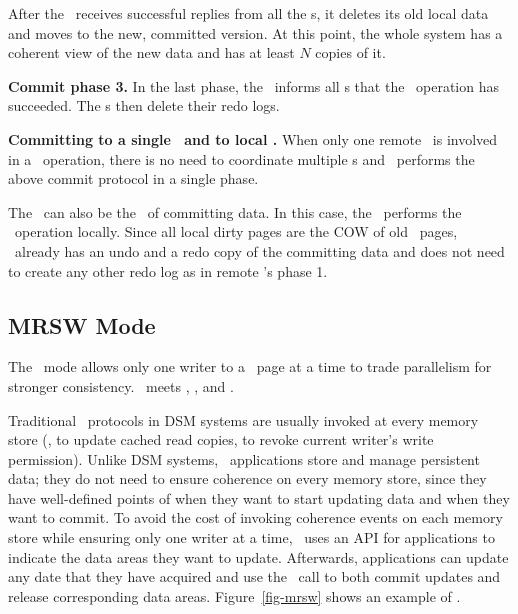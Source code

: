 After the \xn\ receives successful replies from all the \on{}s, 
it deletes its old local data and moves to the new, committed version. 
At this point, the whole system has a coherent view of the new data
and has at least $N$ copies of it.

{\bf Commit phase 3.}
In the last phase, the \xn\ informs all \on{}s that the \commitxact\ operation has succeeded.
The \on{}s then delete their redo logs.

{\bf Committing to a single \on\ and to local \on.}
When only one remote \on\ is involved in a \commitxact\ operation,
there is no need to coordinate multiple \on{}s
and \hotpot\ performs the above commit protocol in a single phase.

The \xn\ can also be the \on\ of committing data.
In this case, the \xn\ performs the \commitxact\ operation locally.
Since all local dirty pages are the COW of old \committed\ pages,
\xn\ already has an undo and a redo copy of the committing data
and does not need to create any other redo log as in remote \on's phase 1.



\subsection{MRSW Mode}
\label{sec:hotpot:mrsw}

The \mrsw\ mode allows only one writer to a \nvm\ page at a time
to trade parallelism for stronger consistency. 
\mrsw\ meets \ra, \rcm, and \re.

Traditional \mrsw\ protocols in DSM systems are usually invoked at every memory store
(\eg, to update cached read copies, to revoke current writer's write permission).
Unlike DSM systems, \dsnvm\ applications store and manage persistent data;
they do not need to ensure coherence on every memory store,
since they have well-defined points of when they want to start updating data and when they want to commit.
To avoid the cost of invoking coherence events on each memory store
while ensuring only one writer at a time, 
\hotpot\ uses an {\em \acquire} API for applications to indicate the data areas they want to update.
Afterwards, applications can update any date that they have acquired and use the \commitxact\ call to both 
commit updates and release corresponding data areas.
Figure~\ref{fig-mrsw} shows an example of \mrsw. %

